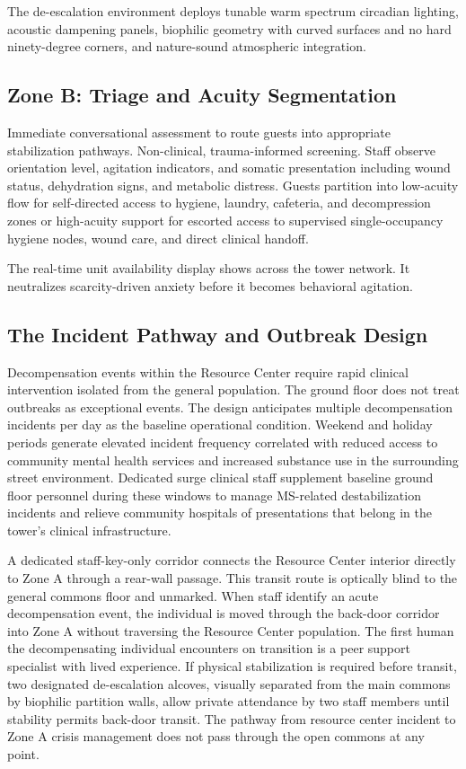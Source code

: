 \documentclass[12pt, letterpaper]{article}
\begin{document}
The de-escalation environment deploys tunable warm spectrum circadian lighting, acoustic dampening panels, biophilic geometry with curved surfaces and no hard ninety-degree corners, and nature-sound atmospheric integration.

\subsection{Zone B: Triage and Acuity Segmentation}

Immediate conversational assessment to route guests into appropriate stabilization pathways. Non-clinical, trauma-informed screening. Staff observe orientation level, agitation indicators, and somatic presentation including wound status, dehydration signs, and metabolic distress. Guests partition into low-acuity flow for self-directed access to hygiene, laundry, cafeteria, and decompression zones or high-acuity support for escorted access to supervised single-occupancy hygiene nodes, wound care, and direct clinical handoff.

The real-time unit availability display shows across the tower network. It neutralizes scarcity-driven anxiety before it becomes behavioral agitation.

\subsection{The Incident Pathway and Outbreak Design}

Decompensation events within the Resource Center require rapid clinical intervention isolated from the general population. The ground floor does not treat outbreaks as exceptional events. The design anticipates multiple decompensation incidents per day as the baseline operational condition. Weekend and holiday periods generate elevated incident frequency correlated with reduced access to community mental health services and increased substance use in the surrounding street environment. Dedicated surge clinical staff supplement baseline ground floor personnel during these windows to manage MS-related destabilization incidents and relieve community hospitals of presentations that belong in the tower's clinical infrastructure.

A dedicated staff-key-only corridor connects the Resource Center interior directly to Zone A through a rear-wall passage. This transit route is optically blind to the general commons floor and unmarked. When staff identify an acute decompensation event, the individual is moved through the back-door corridor into Zone A without traversing the Resource Center population. The first human the decompensating individual encounters on transition is a peer support specialist with lived experience. If physical stabilization is required before transit, two designated de-escalation alcoves, visually separated from the main commons by biophilic partition walls, allow private attendance by two staff members until stability permits back-door transit. The pathway from resource center incident to Zone A crisis management does not pass through the open commons at any point.
\end{document}
